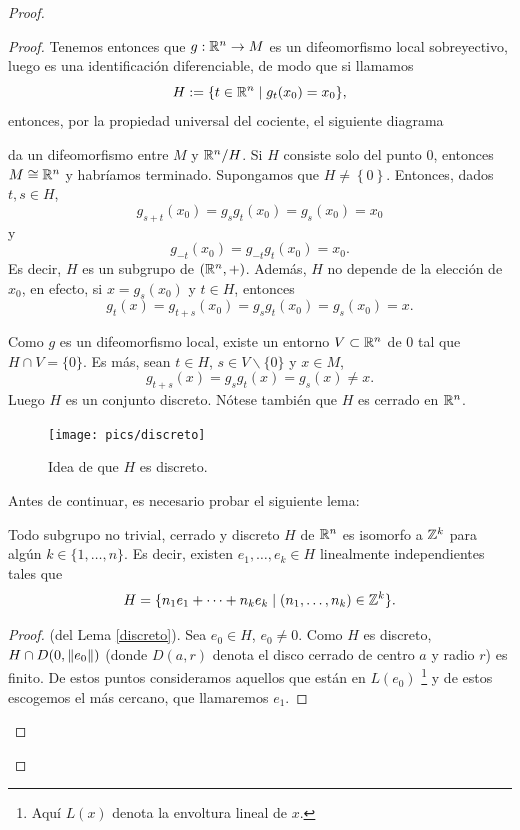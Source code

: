 \begin{proof}
\begin{proof}
Tenemos entonces que $g:\mathbb{R}^n\rightarrow M$ es un difeomorfismo local sobreyectivo, luego es una identificación diferenciable, de modo que si llamamos 
\[  
  H:=\{t \in \mathbb{R}^n \mid g_t(x_0)=x_0\},
\]
entonces, por la propiedad universal del cociente, el siguiente diagrama
\begin{center}
\end{center}
da un difeomorfismo entre $M$ y $\mathbb{R}^n/H$. Si $H$ consiste solo del punto $0$, entonces $M\cong \mathbb{R}^n$ y habríamos terminado. Supongamos que $H\neq\left\{ 0 \right\}$.
 Entonces, dados $t, s \in H$, 
\[
  g_{s+t}(x_0)=g_sg_t(x_0)=g_s(x_0)=x_0
\]
y 
\[
  g_{-t}(x_0)=g_{-t}g_t(x_0)=x_0.
\] 
Es decir, $H$ es un subgrupo de $(\mathbb{R}^n,+)$. Además, $H$ no depende de la elección de $x_0$, en efecto, si $x=g_s (x_0)$ y $t\in H$, entonces 
\[
  g_t (x) = g_{t+s}(x_0)=g_sg_t(x_0)=g_s(x_0)=x. 
 \] 

 Como $g$ es un difeomorfismo local, existe un entorno $V\subset \mathbb{R}^n$ de 0 tal que $H\cap V= \{0\}$. Es más, sean $t\in H$, $s\in V\backslash \{0\}$ y $x\in M$, 
  \[
    g_{t+s}(x)=g_sg_t(x)=g_s(x)\neq x.
  \]
  Luego $H$ es un conjunto discreto. Nótese también que $H$ es cerrado en $\mathbb{R}^n$.
  \begin{figure}[h]
    \centering
    \texttt{[image: pics/discreto]}
    \caption{\small Idea de que $H$ es discreto.}
    \label{fig:discreto}
  \end{figure}

  Antes de continuar, es necesario probar el siguiente lema:
  \begin{lema}\label{discreto}
    Todo subgrupo no trivial, cerrado y discreto $H$ de $\mathbb{R}^n$ es isomorfo a $\mathbb{Z}^k$ para algún $k\in\{1,\dots,n\}$. Es decir, existen $e_1,\dots,e_k \in H$ linealmente independientes tales que 
    \[
      H=\{n_1e_1+\cdots+n_ke_k \mid (n_1,\dots,n_k) \in \mathbb{Z}^k \}.
    \]
  \end{lema}
  \begin{proof}(del Lema \ref{discreto}). 
  Sea $e_0 \in H$, $e_0 \neq 0$. Como $H$ es discreto, $H \cap D(0,\left\Vert e_0\right\Vert)$ (donde $D(a,r)$ denota el disco cerrado de centro $a$ y radio $r$) es finito. De estos puntos consideramos aquellos que están en $L(e_0)$ \footnote{Aquí $L(x)$ denota la envoltura lineal de $x$.} y de estos escogemos el más cercano, que llamaremos $e_1$. 
  

\end{proof}
\end{proof}
\end{proof}
